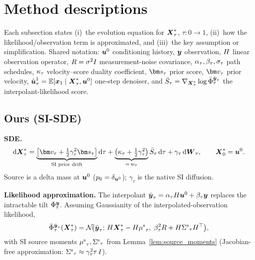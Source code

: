 \section{Method descriptions}\label{appendix:methods}

Each subsection states (i)~the evolution equation for $\boldsymbol{X}^{*}_\tau$, $\tau:0\!\to\!1$, (ii)~how the likelihood/observation term is approximated, and (iii)~the key assumption or simplification.
Shared notation: $\boldsymbol{u}^0$ conditioning history, $\boldsymbol{y}$ observation, $H$ linear observation operator,
$R=\sigma^2 I$ measurement-noise covariance, $\alpha_\tau,\beta_\tau,\sigma_\tau$ path schedules,
$\kappa_\tau$ velocity--score duality coefficient, $\genscore_\tau$ prior score, $\fmvel_\tau$ prior velocity,
$\hat{\boldsymbol{u}}_\tau^1 = \mathbb{E}[\boldsymbol{x}_1\mid\boldsymbol{X}^{*}_\tau,\boldsymbol{u}^0]$ one-step denoiser,
and $\bar{S}_\tau = \nabla_{\boldsymbol{X}^{*}_\tau}\log\bar\Phi_\tau^{\bar{\boldsymbol{y}}_\tau}$ the interpolant-likelihood score.

\subsection{Ours (SI-SDE)}\label{appendix:method:si_sde}

\textbf{SDE.}
\begin{align}
  \rd\bXstar_\tau
  = \underbrace{\bigl[\fmvel_\tau + \tfrac12\gamma_\tau^2\genscore_\tau\bigr]}_{\text{SI prior drift}}\rd\tau
  + \underbrace{\bigl(\vscoef_\tau + \tfrac12\gamma_\tau^2\bigr)}_{=\,\gweight_\tau}\bar{S}_\tau\,\rd\tau
  + \gamma_\tau\,\rd\bW_\tau,
  \qquad \bXstar_0 = \state^0.
\end{align}
Source is a delta mass at $\boldsymbol{u}^0$ ($p_0=\delta_{\boldsymbol{u}^0}$); $\gamma_\tau$ is the native SI diffusion.

\textbf{Likelihood approximation.}
The interpolant $\bar{\boldsymbol{y}}_\tau = \alpha_\tau H\boldsymbol{u}^0 + \beta_\tau\boldsymbol{y}$ replaces the intractable tilt $\Phi_\tau^{\boldsymbol{y}}$.
Assuming Gaussianity of the interpolated-observation likelihood,
\begin{align}
  \bar\Phi_\tau^{\bar{\boldsymbol{y}}_\tau}(\boldsymbol{X}^{*}_\tau)
  = \mathcal{N}\!\bigl(\bar{\boldsymbol{y}}_\tau;\,H\boldsymbol{X}^{*}_\tau - H{\mu^{\mathrm{s}}}_\tau,\;
    \beta_\tau^2R + H{\Sigma^{\mathrm{s}}}_\tau H^\top\bigr),
\end{align}
with SI source moments ${\mu^{\mathrm{s}}}_\tau,{\Sigma^{\mathrm{s}}}_\tau$ from Lemma~\ref{lem:source_moments} (Jacobian-free approximation: ${\Sigma^{\mathrm{s}}}_\tau\approx\gamma_\tau^2\tau\,I$).

